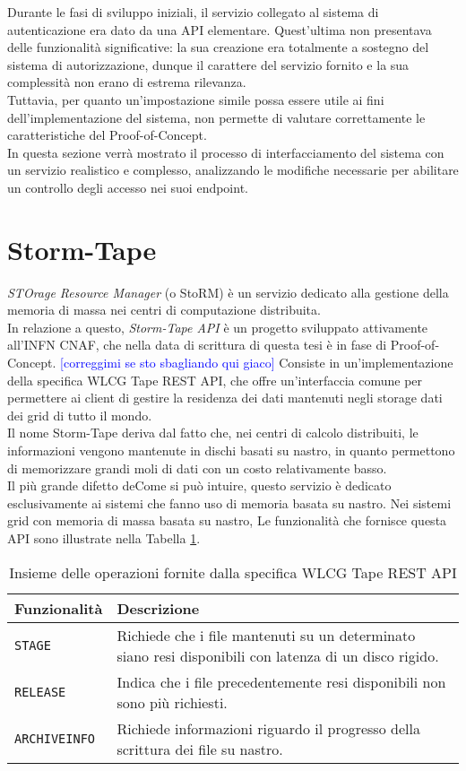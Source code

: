 Durante le fasi di sviluppo iniziali, il servizio collegato al sistema di autenticazione era dato da una API
elementare. Quest'ultima non presentava delle funzionalità significative: la sua creazione era totalmente 
a sostegno del sistema di autorizzazione, dunque il carattere del servizio fornito e la sua complessità non erano 
di estrema rilevanza.  
\\ Tuttavia, per quanto un'impostazione simile possa essere utile ai fini dell'implementazione del sistema, non 
permette di valutare correttamente le caratteristiche del Proof-of-Concept.
\\ In questa sezione verrà mostrato il processo di interfacciamento del sistema con un servizio 
realistico e complesso, analizzando le modifiche necessarie per abilitare un controllo degli accesso
nei suoi endpoint. 
\section{Storm-Tape}
\textit{STOrage Resource Manager} (o StoRM) è un servizio dedicato alla gestione della memoria 
di massa nei centri di computazione distribuita. \\ In relazione a questo, \textit{Storm-Tape API} è un progetto sviluppato
 attivamente all'INFN CNAF, che nella data di scrittura di questa tesi è in fase di Proof-of-Concept.
 \textcolor{blue}{[correggimi se sto sbagliando qui giaco]}
Consiste in un'implementazione della specifica {WLCG Tape REST API}, che offre un'interfaccia comune per permettere 
ai client di gestire la residenza dei dati mantenuti negli storage dati dei grid di tutto il mondo. 
\\ Il nome Storm-Tape deriva dal fatto che, nei centri di calcolo distribuiti,
 le informazioni vengono mantenute in dischi basati su nastro, in quanto permettono di memorizzare 
grandi moli di dati con un costo relativamente basso. \\
Il più grande difetto deCome si può intuire, questo servizio è dedicato esclusivamente ai sistemi che fanno uso di memoria basata su nastro. 
Nei sistemi grid con memoria di massa basata su nastro, 
Le funzionalità che fornisce questa API sono illustrate nella Tabella \ref*{tab:table-name}.
\begin{table}
\begin{center}
\begin{tabular}{ | m{8em} | m{19em} | } 
  \hline
  \textbf{Funzionalità} & \textbf{Descrizione} \\ 
  \hline
  \texttt{STAGE} & Richiede che i file mantenuti su un determinato siano resi disponibili con latenza di un disco rigido. \\ 
  \hline
  \texttt{RELEASE} & Indica che i file precedentemente resi disponibili non sono più richiesti.   \\ 
  \hline
  \texttt{ARCHIVEINFO} & Richiede informazioni riguardo il progresso della scrittura dei file su nastro. \\ 
  \hline
\end{tabular}
\caption{\label{tab:table-name} Insieme delle operazioni fornite dalla specifica WLCG Tape REST API}
\end{center}
\end{table}
